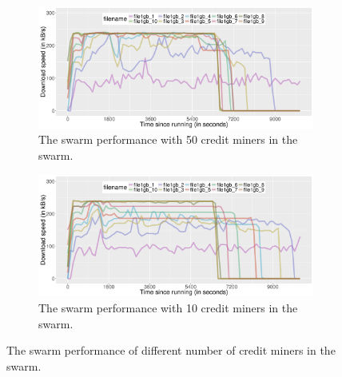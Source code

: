 \begin{figure}[h]
	\begin{subfigure}[h]{\textwidth}
		\centering
		\includegraphics[width=\textwidth]{pics/results/swperf_sc2.png}
		\caption{The swarm performance with 50 credit miners in the swarm.}
		\label{fig:swarmcmperf}
		
	\end{subfigure}
	\begin{subfigure}[h]{\textwidth}
		\centering
		\includegraphics[width=\textwidth]{pics/results/swperf_sc1_10.png}
		\caption{The swarm performance with 10 credit miners in the swarm.}
		\label{fig:swarmcm10perf}
	\end{subfigure}
	\caption{The swarm performance of different number of credit miners in the swarm.}
\end{figure}

